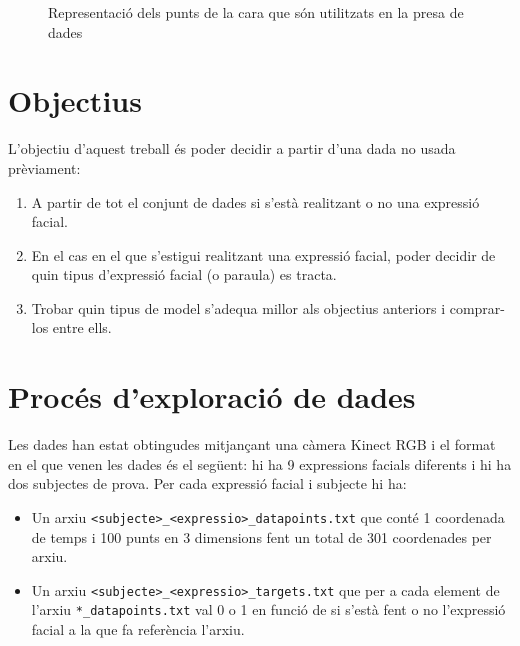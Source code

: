 \documentclass[a4paper]{article}
\begin{document}
\begin{figure}[H]
	\centering
	\caption{Representació dels punts de la cara que són utilitzats en la presa de dades}
\end{figure}

\section{Objectius}

L'objectiu d'aquest treball és poder decidir a partir d'una dada no usada prèviament:
\begin{enumerate}
	\item A partir de tot el conjunt de dades si s'està realitzant o no una expressió facial.
	\item En el cas en el que s'estigui realitzant una expressió facial, poder decidir de quin tipus d'expressió facial (o paraula) es tracta.
	\item Trobar quin tipus de model s'adequa millor als objectius anteriors i comprar-los entre ells.
\end{enumerate}

\section{Procés d'exploració de dades}

Les dades han estat obtingudes mitjançant una càmera Kinect RGB\cite{freitas} i el format en el que venen les dades és el següent: hi ha 9 expressions facials diferents i hi ha dos subjectes de prova. Per cada expressió facial i subjecte hi ha:
\begin{itemize}
	\item Un arxiu \verb|<subjecte>_<expressio>_datapoints.txt| que conté 1 coordenada de temps i 100 punts en 3 dimensions fent un total de 301 coordenades per arxiu.
	\item Un arxiu \verb|<subjecte>_<expressio>_targets.txt| que per a cada element de l'arxiu \verb|*_datapoints.txt| val 0 o 1 en funció de si s'està fent o no l'expressió facial a la que fa referència l'arxiu.
\end{itemize}
\end{document}
